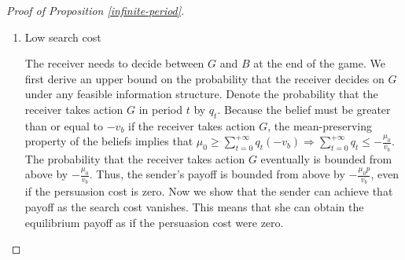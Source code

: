 \documentclass[11pt]{extarticle}
\DeclareMathOperator*{\argmax}{argmax}
\newcommand{\ra}{\Rightarrow}
\begin{document}
\begin{proof}[Proof of Proposition \ref{infinite-period}]
\begin{enumerate}[(1)]
\begin{comment}
		Because the receiver's expected payoff during time $t \geq t'$ is zero, the optimal signal in time $t'-1$ is one-shot - the receiver takes action $G$ right after observing a positive signal. Suppose not, then the receiver searches for more information regardless of the signal realization, or searches for more information after observing a positive signal and takes action $B$ after observing a negative signal (clearly, he will not search and take action G regardless of the signal realization). But then, the receiver's expected surplus will be strictly negative because search is costly and he does not gain any utility in $t = t'-1$. Hence, the optimal signal in time $t'-1$ is one-shot. We just need to show that $(\lambda_{t'-1}^*,\bar{\mu}_{t'-1}^*) = (c/v_g,1)$. The sender's problem in $t = t'-1$ is:
		\begin{align*}
		 \max\limits_{\lambda_t, \bar{\mu_t}}& -K(\lambda_t) + p \lambda_t + (1-\lambda_t) V_t\\
		s.t.~&\lambda_t (\bar{\mu_t} + v_b) \geq c \tag{$IR_t$} \\
		& \lambda_t \bar{\mu_t} + (1-\lambda_t) \underline{\mu}_t = \mu_t \tag{$F_t$}\\
		&(\lambda_{t},\bar{\mu}_{t}) = (c/v_g,1),~ \forall t \geq t'\\
		&V_t = \sum_{i=0}^{k-t-1}(1-\frac{c}{v_g})^i \left[\frac{cp}{v_g} - K(\frac{c}{v_g})\right]
		\end{align*}
		Denote the optimal $\lambda_t$ without constraints by $\lambda_{t,H}^{**}$. $\lambda_{t,H}^{**} = \argmax\limits_{\lambda_t} -K(\lambda_t) + p \lambda_t + (1-\lambda_t) V_t$. The F.O.C. of $-K(\lambda_t) + p \lambda_t + (1-\lambda_t) V_t \ra K'(\lambda_{t,H}^{**}) = p - V_t < p = K'(\lambda_1^{**}) \ra \lambda_{t,H}^{**} < \lambda_1^{**} \leq c/v_g$. So, $(\lambda_{t}^*,\bar{\mu}_{t}^*) = (c/v_g,1)$.
		
		Therefore, the induction shows that the sender provides one-shot signal $(\lambda_{t}^*,\bar{\mu}_{t}^*) = (c/v_g,1)$ in each period, $t = 0, 1, ..., k-1$.
		\end{comment}
		
		
		\item Low search cost
		
		The receiver needs to decide between $G$ and $B$ at the end of the game. We first derive an upper bound on the probability that the receiver decides on $G$ under any feasible information structure. Denote the probability that the receiver takes action $G$ in period $t$ by $q_t$. Because the belief must be greater than or equal to $-v_b$ if the receiver takes action $G$, the mean-preserving property of the beliefs implies that $\mu_0 \geq \sum_{t=0}^{+\infty} q_t (-v_b) \ra \sum_{t=0}^{+\infty} q_t \leq -\frac{\mu_0}{v_b}$. %
		The probability that the receiver takes action $G$ eventually is bounded from above by $-\frac{\mu_0}{v_b}$. Thus, the sender's payoff is bounded from above by $-\frac{\mu_0 p}{v_b}$, even if the persuasion cost is zero. Now we show that the sender can achieve that payoff as the search cost vanishes. This means that she can obtain the equilibrium payoff as if the persuasion cost were zero.
	

\end{enumerate}
\end{proof}
\end{document}

